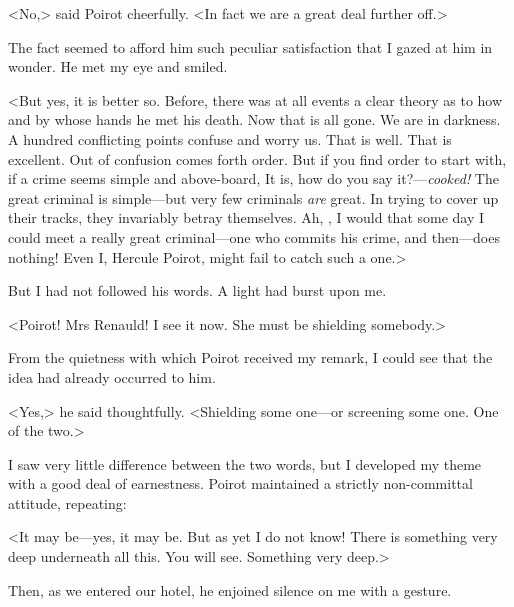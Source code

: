 <No,> said Poirot cheerfully. <In fact we are a great deal further off.> 

 The fact seemed to afford him such peculiar satisfaction that I gazed at him in wonder. He met my eye and smiled. 

 <But yes, it is better so. Before, there was at all events a clear theory as to how and by whose hands he met his death. Now that is all gone. We are in darkness. A hundred conflicting points confuse and worry us. That is well. That is excellent. Out of confusion comes forth order. But if you find order to start with, if a crime seems simple and above-board,  It is, how do you say it?—\emph{cooked!} The great criminal is simple—but very few criminals \emph{are} great. In trying to cover up their tracks, they invariably betray themselves. Ah, , I would that some day I could meet a really great criminal—one who commits his crime, and then—does nothing! Even I, Hercule Poirot, might fail to catch such a one.> 

 But I had not followed his words. A light had burst upon me. 

 <Poirot! Mrs Renauld! I see it now. She must be shielding somebody.> 

 From the quietness with which Poirot received my remark, I could see that the idea had already occurred to him. 

 <Yes,> he said thoughtfully. <Shielding some one—or screening some one. One of the two.> 

 I saw very little difference between the two words, but I developed my theme with a good deal of earnestness. Poirot maintained a strictly non-committal attitude, repeating: 

 <It may be—yes, it may be. But as yet I do not know! There is something very deep underneath all this. You will see. Something very deep.> 

 Then, as we entered our hotel, he enjoined silence on me with a gesture.